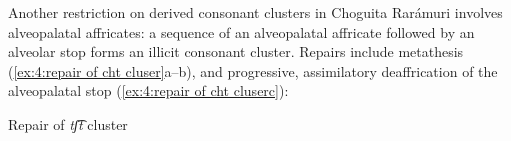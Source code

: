 Another restriction on derived consonant clusters in Choguita Rarámuri involves alveopalatal affricates: a sequence of an alveopalatal affricate followed by an alveolar stop forms an illicit consonant cluster. Repairs include metathesis (\ref{ex:4:repair of cht cluser}a--b), and progressive, assimilatory deaffrication of the alveopalatal stop (\ref{ex:4:repair of cht cluserc}):

\break

\ea\label{ex:4:repair of cht cluser}
{Repair of \textit{tʃ͡t} cluster}

    \label{ex:4:repair of cht clusera}
        \label{ex:4:repair of cht cluserb}
            \label{ex:4:repair of cht cluserc}
    \z
\z




